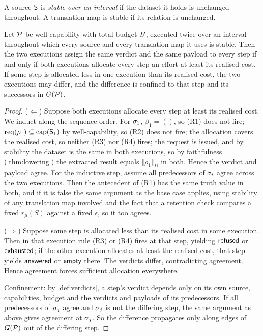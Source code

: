 \begin{definition}[Stability]
\label{def:stable}
A source $\mathsf{S}$ is \emph{stable over an interval} if the dataset it holds is
unchanged throughout. A translation map is stable if its relation is unchanged.
\end{definition}

\begin{theorem}
\label{thm:idempotent}
Let $\mathcal{P}$ be well-capability with total budget $B$, executed twice over an
interval throughout which every source and every translation map it uses is
stable. Then the two executions assign the same verdict and the same payload to
every step if and only if both executions allocate every step an effort at
least its realised cost. If some step is allocated less in one execution than
its realised cost, the two executions may differ, and the difference is
confined to that step and its successors in $G(\mathcal{P})$.
\end{theorem}

\begin{proof}
($\Leftarrow$) Suppose both executions allocate every step at least its
realised cost. We induct along the sequence order. For $\sigma_1$,
$\beta_1 = ()$, so (R1) does not fire; $\mathrm{req}(\rho_1) \subseteq \mathrm{cap}(\mathsf{S}_1)$ by
well-capability, so (R2) does not fire; the allocation covers the realised
cost, so neither (R3) nor (R4) fires; the request is issued, and by stability
the dataset is the same in both executions, so by faithfulness
(\cref{thm:lowering}) the extracted result equals
$\llbracket \rho_1 \rrbracket_D$ in both. Hence the verdict and payload agree.
For the inductive step, assume all predecessors of $\sigma_i$ agree across the
two executions. Then the antecedent of (R1) has the same truth value in both,
and if it is false the same argument as the base case applies, using stability
of any translation map involved and the fact that a retention check compares a
fixed $r_\mu(S)$ against a fixed $\epsilon$, so it too agrees.

($\Rightarrow$) Suppose some step is allocated less than its realised cost in
some execution. Then in that execution rule (R3) or (R4) fires at that step,
yielding $\textsf{refused}$ or $\textsf{exhausted}$; if the other execution allocates at least the
realised cost, that step yields $\textsf{answered}$ or $\textsf{empty}$ there. The verdicts
differ, contradicting agreement. Hence agreement forces sufficient allocation
everywhere.

Confinement: by \cref{def:verdicts}, a step's verdict depends only on its own
source, capabilities, budget and the verdicts and payloads of its predecessors.
If all predecessors of $\sigma_j$ agree and $\sigma_j$ is not the differing step,
the same argument as above gives agreement at $\sigma_j$. So the difference
propagates only along edges of $G(\mathcal{P})$ out of the differing step.
\end{proof}

